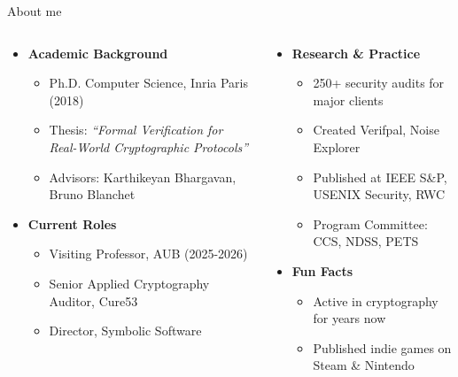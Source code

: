 \documentclass[aspectratio=169, lualatex, handout]{beamer}
\begin{document}
\begin{frame}{About me}
	\begin{columns}[c]
		\begin{column}{0.5\textwidth}
			\begin{itemize}
				\item \textbf{Academic Background}
				      \begin{itemize}[<+->]
					      \item Ph.D. Computer Science, Inria Paris (2018)
					      \item Thesis: \textit{``Formal Verification for Real-World Cryptographic Protocols''}
					      \item Advisors: Karthikeyan Bhargavan, Bruno Blanchet
				      \end{itemize}
			\end{itemize}
			\begin{itemize}
				\item \textbf{Current Roles}
				      \begin{itemize}[<+->]
					      \item Visiting Professor, AUB (2025-2026)
					      \item Senior Applied Cryptography Auditor, Cure53
					      \item Director, Symbolic Software
				      \end{itemize}
			\end{itemize}
		\end{column}
		\begin{column}{0.5\textwidth}
			\begin{itemize}
				\item \textbf{Research \& Practice}
				      \begin{itemize}[<+->]
					      \item 250+ security audits for major clients
					      \item Created Verifpal, Noise Explorer
					      \item Published at IEEE S\&P, USENIX Security, RWC
					      \item Program Committee: CCS, NDSS, PETS
				      \end{itemize}
			\end{itemize}
			\begin{itemize}
				\item \textbf{Fun Facts}
				      \begin{itemize}[<+->]
					      \item Active in cryptography for  years now
					      \item Published indie games on Steam \& Nintendo
				      \end{itemize}
			\end{itemize}
		\end{column}
	\end{columns}
\end{frame}
\end{document}
